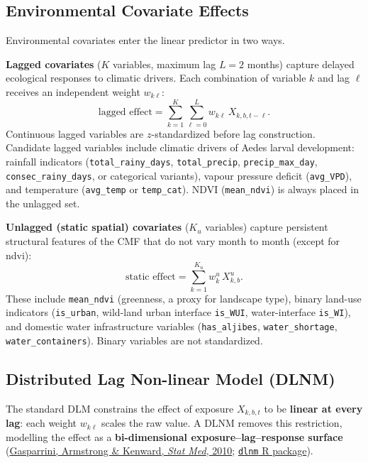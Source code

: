 \documentclass[12pt,a4paper]{article}
\begin{document}
\subsection{Environmental Covariate Effects}

Environmental covariates enter the linear predictor in two ways.

\textbf{Lagged covariates} ($K$ variables, maximum lag $L = 2$ months) capture delayed ecological
responses to climatic drivers. Each combination of variable $k$ and lag $\ell$ receives an
independent weight $w_{k\ell}$:
\begin{equation}
  \text{lagged effect} = \sum_{k=1}^{K} \sum_{\ell=0}^{L} w_{k\ell}\, X_{k,b,t-\ell}.
\end{equation}
Continuous lagged variables are $z$-standardized before lag construction. Candidate lagged
variables include climatic drivers of Aedes larval development: rainfall indicators
(\texttt{total\_rainy\_days}, \texttt{total\_precip}, \texttt{precip\_max\_day},
\texttt{consec\_rainy\_days}, or categorical variants), vapour pressure deficit
(\texttt{avg\_VPD}), and temperature (\texttt{avg\_temp} or \texttt{temp\_cat}).
NDVI (\texttt{mean\_ndvi}) is always placed in the unlagged set.

\textbf{Unlagged (static spatial) covariates} ($K_u$ variables) capture persistent structural
features of the CMF that do not vary month to month (except for ndvi):
\begin{equation}
  \text{static effect} = \sum_{k=1}^{K_u} w_k^u\, X_{k,b}^u.
\end{equation}
These include \texttt{mean\_ndvi} (greenness, a proxy for landscape type), binary land-use indicators (\texttt{is\_urban}, wild-land urban interface \texttt{is\_WUI}, water-interface \texttt{is\_WI}), and domestic water infrastructure variables (\texttt{has\_aljibes}, \texttt{water\_shortage}, \texttt{water\_containers}). Binary variables are not standardized.

\subsection{Distributed Lag Non-linear Model (DLNM)}
\label{sec:dlnm}

The standard DLM constrains the effect of exposure $X_{k,b,t}$ to be \textbf{linear at every lag}: each weight $w_{k\ell}$ scales the raw value. A DLNM removes this restriction, modelling the effect as a \textbf{bi-dimensional exposure--lag--response surface}
(\href{https://pubmed.ncbi.nlm.nih.gov/20812303/}{Gasparrini, Armstrong \& Kenward, \textit{Stat Med}, 2010};
\href{http://www.ag-myresearch.com/package-dlnm.html}{\texttt{dlnm} R package}).
\end{document}
